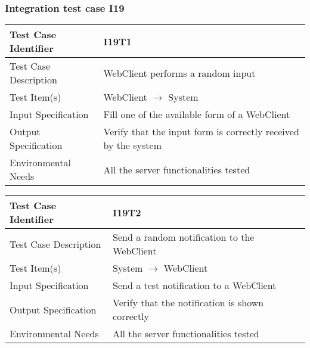 		\subsubsection{Integration test case I19}
		\begin{center}
			\begin{tabular}{ |l p{10cm}| } \hline
				Test Case Identifier & I19T1\\ \hline
				Test Case Description & WebClient performs a random input  \\ \hline
				Test Item(s) & WebClient $\rightarrow$ System \\ \hline
				Input Specification & Fill one of the available form of a WebClient \\ \hline
				Output Specification & Verify that the input form is correctly received by the system \\ \hline
				Environmental Needs & All the server functionalities tested \\ \hline
			\end{tabular}
		\end{center}
		\begin{center}
			\begin{tabular}{ |l p{10cm}| } \hline
				Test Case Identifier & I19T2 \\ \hline
				Test Case Description & Send a random notification to the WebClient \\ \hline
				Test Item(s) & System $\rightarrow$ WebClient \\ \hline
				Input Specification & Send a test notification to a WebClient \\ \hline
				Output Specification & Verify that the notification is shown correctly \\ \hline
				Environmental Needs & All the server functionalities tested \\ \hline
			\end{tabular}
		\end{center}
